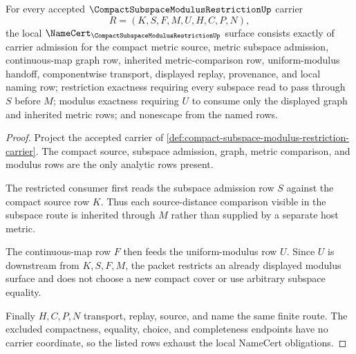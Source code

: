 \begin{theorem}
\label{thm:compact-subspace-modulus-restriction-namecert-obligations}
For every accepted $\CompactSubspaceModulusRestrictionUp$ carrier
$$
R=(K,S,F,M,U,H,C,P,N),
$$
the local $\NameCert_{\CompactSubspaceModulusRestrictionUp}$ surface consists exactly of carrier admission for the compact metric source, metric subspace admission, continuous-map graph row, inherited metric-comparison row, uniform-modulus handoff, componentwise transport, displayed replay, provenance, and local naming row; restriction exactness requiring every subspace read to pass through $S$ before $M$; modulus exactness requiring $U$ to consume only the displayed graph and inherited metric rows; and nonescape from the named rows.
\end{theorem}
\begin{proof}
Project the accepted carrier of \autoref{def:compact-subspace-modulus-restriction-carrier}. The compact source, subspace admission, graph, metric comparison, and modulus rows are the only analytic rows present.

The restricted consumer first reads the subspace admission row $S$ against the compact source row $K$. Thus each source-distance comparison visible in the subspace route is inherited through $M$ rather than supplied by a separate host metric.

The continuous-map row $F$ then feeds the uniform-modulus row $U$. Since $U$ is downstream from $K,S,F,M$, the packet restricts an already displayed modulus surface and does not choose a new compact cover or use arbitrary subspace equality.

Finally $H,C,P,N$ transport, replay, source, and name the same finite route. The excluded compactness, equality, choice, and completeness endpoints have no carrier coordinate, so the listed rows exhaust the local NameCert obligations.
\end{proof}


